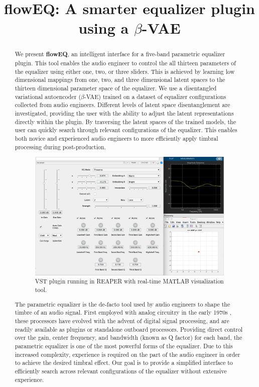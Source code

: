 \documentclass[a4paper]{article} %
\title{\MakeLowercase{flow}EQ: A smarter equalizer plugin using a $\beta$-VAE}
\begin{document}
\maketitle

\begin{abstract}


We present \textbf{flowEQ}, an intelligent interface for a five-band parametric equalizer plugin. 
This tool enables the audio engineer to control the all thirteen parameters of the equalizer using either one, two, or three sliders. 
This is achieved by learning low dimensional mappings from one, two, and three dimensional latent spaces to the thirteen dimensional parameter space of the equalizer. 
We use a disentangled variational autoencoder ($\beta$-VAE) trained on a dataset of equalizer configurations collected from audio engineers. 
Different levels of latent space disentanglement are investigated, providing the user with the ability to adjust the latent representations directly within the plugin. 
By traversing the latent spaces of the trained models, the user can quickly search through relevant configurations of the equalizer. 
This enables both novice and experienced audio engineers to more efficiently apply timbral processing during post-production.


\begin{figure}[H]
  \centerline{
  \includegraphics[width=0.5\columnwidth]{../../img/full_visual.png}}
  \caption{VST plugin running in REAPER with real-time MATLAB visualization tool.}
  \label{fig:plugin}
 \end{figure}


The parametric equalizer is the de-facto tool used by audio engineers to shape the timbre of an audio signal. 
First employed with analog circuitry in the early 1970s \cite{massenburg}, these processors have evolved with the advent of digital signal processing, and are readily available as plugins or standalone outboard processors. 
Providing direct control over the gain, center frequency, and bandwidth (known as Q factor) for each band, the parametric equalizer is one of the most powerful forms of the equalizer. 
Due to this increased complexity, experience is required on the part of the audio engineer in order to achieve the desired timbral effect. 
Our goal is to provide a simplified interface to efficiently search across relevant configurations of the equalizer without extensive experience. 


\end{abstract}
\end{document}
